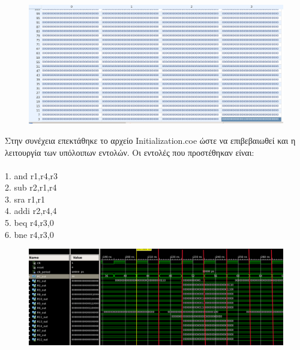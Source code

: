 \begin{figure}[h]
    \centering
    \hspace{-1cm}
    \includegraphics[width=1\textwidth]{Images/Screenshot_3.png} %
\end{figure}

\begin{justify}
    Στην συνέχεια επεκτάθηκε το αρχείο \textlatin{Initialization.coe}
    ώστε να επιβεβαιωθεί και η λειτουργία
    των υπόλοιπων εντολών. Οι εντολές που προστέθηκαν είναι:\\\\
    \textlatin{1. and r1,r4,r3}\\
    \textlatin{2. sub r2,r1,r4}\\
    \textlatin{3. sra r1,r1}\\
    \textlatin{4. addi r2,r4,4}\\
    \textlatin{5. beq r4,r3,0}\\
    \textlatin{6. bne r4,r3,0}
\end{justify}

\newpage

\begin{figure}[h]
    \raggedright
    \hspace{-1cm}
    \includegraphics[width=1.1\textwidth]{Images/Screenshot_4.png} %
\end{figure}


